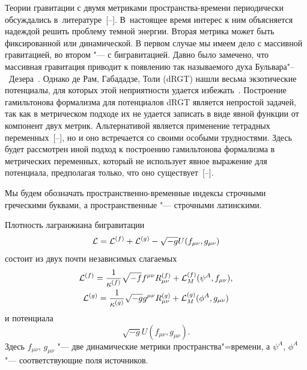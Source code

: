 
\date{16/XII/2014} %




\makerutitle


Теории гравитации с двумя метриками пространства-времени периодически обсуждались в~литературе~[--]. 
В~настоящее время интерес к ним  объясняется надеждой решить  проблему темной энергии. 
Вторая метрика может быть фиксированной или динамической. В первом случае  мы имеем дело с массивной гравитацией, во втором "--- с бигравитацией. 
Давно было замечено, что массивная гравитация приводит к появлению так называемого духа Бульвара"--~Дезера~\cite{BD}. Однако де Рам, Габададзе, Толи (dRGT) нашли весьма экзотические потенциалы, для которых этой неприятности удается избежать~\cite{dRGT-1, dRGT-2, HR_bi, HR2}.  Построение гамильтонова формализма для потенциалов dRGT является непростой задачей, так как в метрическом подходе их не удается записать в виде явной функции от компонент двух метрик. 
Альтернативой является применение тетрадных переменных~[--], но и оно встречается со своими особыми трудностями. 
Здесь будет рассмотрен иной подход к построению гамильтонова формализма в метрических переменных, который не использует явное выражение для потенциала, предполагая только, что оно существует~[--]. 


Мы будем обозначать пространственно-временные индексы строчными греческими буквами, а пространственные "--- строчными латинскими.

\smallskip

Плотность лагранжиана бигравитации
\begin{equation}
{\cal L}={\cal L}^{(f)}+{\cal L}^{(g)}-\sqrt{-g}U( f_{\mu\nu}, g_{\mu\nu})
\end{equation}
состоит из двух почти независимых слагаемых
\begin{gather}
{\cal L}^{(f)}=\frac{1}{\kappa^{(f)}}\sqrt{-f}f^{\mu\nu}R_{\mu\nu}^{(f)}+{\cal L}_M^{(f)}(\psi^A, f_{\mu\nu}),\\
{\cal L}^{(g)}=\frac{1}{\kappa^{(g)}}\sqrt{-g}g^{\mu\nu}R_{\mu\nu}^{(g)}+{\cal L}_M^{(g)}(\phi^A, g_{\mu\nu})
\end{gather}
и потенциала
$$
\sqrt{-g}U( f_{\mu\nu}, g_{\mu\nu}). 
$$
Здесь $f_{\mu\nu}$, $g_{\mu\nu}$ "--- две динамические метрики пространства"=времени, а $\psi^A$, $\phi^A$ "--- соответствующие поля источников.

